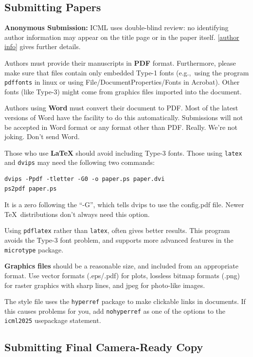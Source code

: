 \documentclass{article}
\theoremstyle{plain}
\theoremstyle{definition}
\theoremstyle{remark}
\begin{document}
\subsection{Submitting Papers}

\textbf{Anonymous Submission:} ICML uses double-blind review: no identifying
author information may appear on the title page or in the paper
itself. \cref{author info} gives further details.

\medskip

Authors must provide their manuscripts in \textbf{PDF} format.
Furthermore, please make sure that files contain only embedded Type-1 fonts
(e.g.,~using the program \texttt{pdffonts} in linux or using
File/DocumentProperties/Fonts in Acrobat). Other fonts (like Type-3)
might come from graphics files imported into the document.

Authors using \textbf{Word} must convert their document to PDF\@. Most
of the latest versions of Word have the facility to do this
automatically. Submissions will not be accepted in Word format or any
format other than PDF\@. Really. We're not joking. Don't send Word.

Those who use \textbf{\LaTeX} should avoid including Type-3 fonts.
Those using \texttt{latex} and \texttt{dvips} may need the following
two commands:

{\footnotesize
\begin{verbatim}
dvips -Ppdf -tletter -G0 -o paper.ps paper.dvi
ps2pdf paper.ps
\end{verbatim}}
It is a zero following the ``-G'', which tells dvips to use
the config.pdf file. Newer \TeX\ distributions don't always need this
option.

Using \texttt{pdflatex} rather than \texttt{latex}, often gives better
results. This program avoids the Type-3 font problem, and supports more
advanced features in the \texttt{microtype} package.

\textbf{Graphics files} should be a reasonable size, and included from
an appropriate format. Use vector formats (.eps/.pdf) for plots,
lossless bitmap formats (.png) for raster graphics with sharp lines, and
jpeg for photo-like images.

The style file uses the \texttt{hyperref} package to make clickable
links in documents. If this causes problems for you, add
\texttt{nohyperref} as one of the options to the \texttt{icml2025}
usepackage statement.


\subsection{Submitting Final Camera-Ready Copy}
\end{document}

